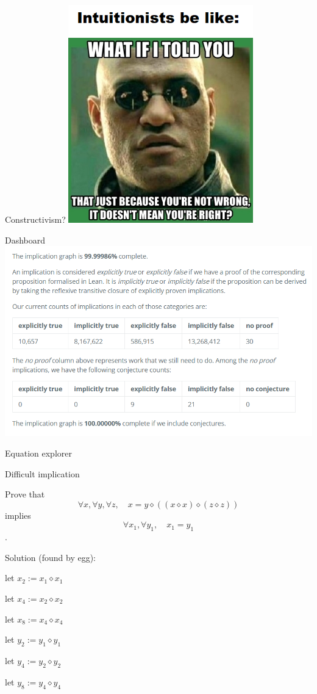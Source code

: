 \documentclass{beamer}
\newcommand{\op}{\diamond}
\begin{document}
\begin{frame}{Constructivism?}
\includegraphics[width=0.6\textwidth]{intuitionists}
\end{frame}


\begin{frame}{Dashboard}
\includegraphics[width=\textwidth]{dashboard}
\end{frame}


\begin{frame}{Equation explorer}
\end{frame}


\begin{frame}{Difficult implication}

Prove that
$$ \forall x, \forall y,\forall z,\quad x = y \op ((x \op x) \op (z \op z)) $$
implies
$$ \forall x_1, \forall y_1,\quad x_1 = y_1 $$
.

\pause
Solution (found by egg):\smallskip

let $x_2 := x_1 \op x_1$

let $x_4 := x_2 \op x_2$

let $x_8 := x_4 \op x_4$

let $y_2 := y_1 \op y_1$

let $y_4 := y_2 \op y_2$

let $y_8 := y_4 \op y_4$

\end{frame}
\end{document}

